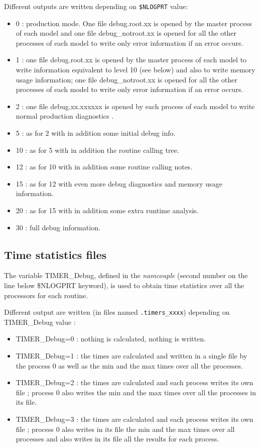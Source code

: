 Different outputs are written depending on {\tt \$NLOGPRT} value:
\begin{itemize}
\item {0} : production mode. One file debug.root.xx is opened by the master process of
  each model and one file debug\_notroot.xx is opened for all the other
  processes of each model to write only error information if an error
  occurs.
\item {1} : one file debug.root.xx is opened by the master process of
  each model to write information equivalent to level 10 (see below)
  and also to write memory usage information;
  one file debug\_notroot.xx is opened for all the other processes of
  each model to write only error information if an error occurs.
\item {2} : one file debug.xx.xxxxxx is opened by each process of each
  model to write normal production diagnostics .
\item {5} : as for 2 with in addition some initial debug info.
\item {10} : as for 5 with in addition the routine calling tree.
\item {12} : as for 10 with in addition some routine calling notes.
\item {15} : as for 12 with even more debug diagnostics and memory usage information.
\item {20} : as for 15 with in addition some extra runtime analysis.
\item {30} : full debug information.
\end{itemize}

\subsection{Time statistics files}
\label{timestat}

The variable TIMER\_Debug, defined in the {\it namcouple} (second
number on the line below \$NLOGPRT keyword), is used to obtain time
statistics over all the processors for each routine.

Different output are written (in files named {\tt *.timers\_xxxx})
depending on TIMER\_Debug value :

\begin{itemize}
\item {TIMER\_Debug=0} : nothing is calculated, nothing is written.
\item {TIMER\_Debug=1} : the times are calculated and written in a
  single file by the process 0 as well as the min and the max times
  over all the processes.
\item {TIMER\_Debug=2} : the times are calculated and each process
  writes its own file ; process 0 also writes the min and the max
  times over all the processes in its file.
\item {TIMER\_Debug=3} : the times are calculated and each process
  writes its own file ; process 0 also writes in its file the min
  and the max times over all processes and also writes in its file
  all the results for each process.
\end{itemize}

